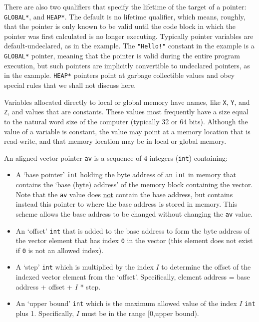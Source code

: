 \documentclass[12pt]{article}
\begin{document}
There are also two qualifiers that specify the lifetime of the target
of a pointer: {\tt *GLOBAL*}, and {\tt *HEAP*}.  The
default is no lifetime qualifier,
which means, roughly, that the pointer is only known to be valid until
the code block in which the pointer was first calculated is no
longer executing.  Typically pointer variables are default-undeclared,
as in the example.  The {\tt "Hello!"} constant in the example is
a {\tt *GLOBAL*} pointer, meaning that the pointer is valid during the
entire program execution, but such pointers are implicitly convertible
to undeclared pointers, as in the example.  {\tt *HEAP*} pointers
point at garbage collectible values and obey special rules that we
shall not discuss here.

Variables allocated directly to local or global memory
have names, like {\tt X}, {\tt Y}, and {\tt Z}, and values
that are constants.
These values most frequently
have a size equal to the natural
word size of the computer (typically 32 or 64 bits).
Although the value of a variable is constant, the value may point
at a memory location that is read-write, and that memory location
may be in local or global memory.

An aligned vector pointer {\tt av} is a sequence of 4
integers ({\tt int}) containing:
\begin{itemize}
\item A `base pointer' {\tt int} holding the byte address
of an {\tt int} in memory
that contains the `base (byte) address' of the memory block
containing the vector.
Note that the {\tt av} value does \underline{not} contain
the base address, but contains instead this pointer to where
the base address is stored in memory.  This scheme allows
the base address to be changed without changing the {\tt av} value.
\item An `offset' {\tt int} that is added to the base address
to form the byte address of the vector element
that has index {\tt 0} in the vector (this element does not
exist if {\tt 0} is not an allowed index).
\item A `step' {\tt int} which is multiplied by the index $I$ to
determine the offset of the indexed vector element from the
`offset'.  Specifically, element address = base address + offset + $I$ * step.
\item An `upper bound' {\tt int} which is the maximum allowed
value of the index $I$ {\tt int} plus 1.  Specifically,
$I$ must be in the range [0,upper bound).
\end{itemize}
\end{document}
